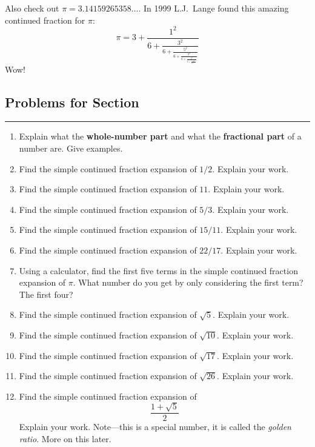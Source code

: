 Also check out $\pi = 3.14159265358\dots$. In 1999
L.J.\ Lange found this amazing continued fraction for $\pi$:
\[
\pi = 3 + \frac{1^2}{\displaystyle 6
          + \frac{3^2}{\displaystyle 6 
          + \frac{5^2}{\displaystyle 6 
       + \frac{7^2}{\displaystyle 6 
          + \frac{9^2}{\displaystyle 6 
       + \frac{11^2}{\displaystyle 6 + \cdots
}}}}}}
\]
Wow!



\newpage

\subsection*{Problems for Section \thesection}\hrule\vspace{1ex}
\begin{enumerate}
\item Explain what the \textbf{whole-number part} and what the
  \textbf{fractional part} of a number are. Give examples.
\item Find the simple continued fraction expansion of $1/2$. Explain
  your work.
\item Find the simple continued fraction expansion of $11$. Explain
  your work.
\item Find the simple continued fraction expansion of $5/3$. Explain
  your work.
\item Find the simple continued fraction expansion of $15/11$. Explain
  your work.
\item Find the simple continued fraction expansion of $22/17$. Explain
  your work.
\item Using a calculator, find the first five terms in the simple
  continued fraction expansion of $\pi$. What number do you get by
  only considering the first term? The first four?
\item Find the simple continued fraction expansion of
  $\sqrt{5}$. Explain your work.
\item Find the simple continued fraction expansion of
  $\sqrt{10}$. Explain your work.
\item Find the simple continued fraction expansion of
  $\sqrt{17}$. Explain your work.
\item Find the simple continued fraction expansion of
  $\sqrt{26}$. Explain your work.
\item Find the simple continued fraction expansion of
\[
\frac{1 + \sqrt{5}}{2}
\]
Explain your work. Note---this is a special number, it is called the
\textit{golden ratio}. More on this later.

\end{enumerate}
